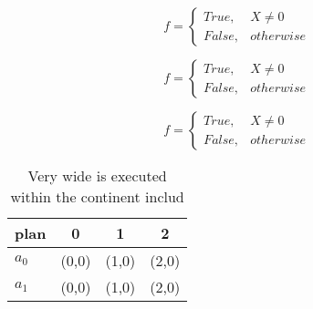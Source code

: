 \documentclass[a4paper]{article}
\begin{document}
\begin{equation}   f =
\begin{cases} True, & X \neq 0\\
False, & otherwise
\end{cases}
\end{equation}

\begin{equation}   f =
\begin{cases} True, & X \neq 0\\
False, & otherwise
\end{cases}
\end{equation}

\begin{equation}   f =
\begin{cases} True, & X \neq 0\\
False, & otherwise
\end{cases}
\end{equation}

\begin{table}
\begin{adjustbox}{width=0.6\columnwidth}
\begin{tabular}{|l|l|l|l|}
\hline
\textbf{plan} & \multicolumn{1}{c|}{\textbf{0}} & \multicolumn{1}{c|}{\textbf{1}} & \multicolumn{1}{c|}{\textbf{2}} \\ \hline
\textbf{$a_0$}  & (0,0) & (1,0) & (2,0) \\ \hline
\textbf{$a_1$}  & (0,0) & (1,0) & (2,0) \\ \hline
\end{tabular}
\end{adjustbox}
\caption{Very wide is executed within the continent includ
}
\end{table}
\end{document}
